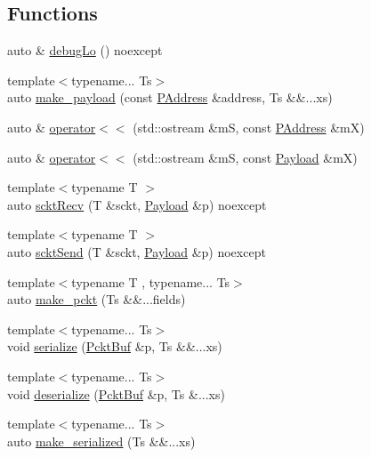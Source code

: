 \subsection*{Functions}
\begin{DoxyCompactItemize}
\item 
auto \& \hyperlink{namespacenl_a37c9c3a7bf35b2f56ab60abd0d6bd881}{debug\+Lo} () noexcept
\item 
{\footnotesize template$<$typename... Ts$>$ }\\auto \hyperlink{namespacenl_a4095539ce3ed59fbc0475a2630547294}{make\+\_\+payload} (const \hyperlink{structnl_1_1PAddress}{P\+Address} \&address, Ts \&\&...xs)
\item 
auto \& \hyperlink{namespacenl_a08c7e64bbcf163119a45fe1dc13b7b16}{operator$<$$<$} (std\+::ostream \&m\+S, const \hyperlink{structnl_1_1PAddress}{P\+Address} \&m\+X)
\item 
auto \& \hyperlink{namespacenl_aa6e936e1626c0ed89a68488298836a33}{operator$<$$<$} (std\+::ostream \&m\+S, const \hyperlink{structnl_1_1Payload}{Payload} \&m\+X)
\item 
{\footnotesize template$<$typename T $>$ }\\auto \hyperlink{namespacenl_a60cd68edf0d89cedfd2486d4ab034514}{sckt\+Recv} (T \&sckt, \hyperlink{structnl_1_1Payload}{Payload} \&p) noexcept
\item 
{\footnotesize template$<$typename T $>$ }\\auto \hyperlink{namespacenl_afa96089eb206f528f755cf13cba1fb05}{sckt\+Send} (T \&sckt, \hyperlink{structnl_1_1Payload}{Payload} \&p) noexcept
\item 
{\footnotesize template$<$typename T , typename... Ts$>$ }\\auto \hyperlink{namespacenl_a72200b84c380aa849c4b1c436d06b9af}{make\+\_\+pckt} (Ts \&\&...fields)
\item 
{\footnotesize template$<$typename... Ts$>$ }\\void \hyperlink{namespacenl_adac56cebe608906f650a64c4316a2731}{serialize} (\hyperlink{namespacenl_a789b828a23e37a113433c2838e7c8e28}{Pckt\+Buf} \&p, Ts \&\&...xs)
\item 
{\footnotesize template$<$typename... Ts$>$ }\\void \hyperlink{namespacenl_a1d08698ff343183973b60f364e70295d}{deserialize} (\hyperlink{namespacenl_a789b828a23e37a113433c2838e7c8e28}{Pckt\+Buf} \&p, Ts \&...xs)
\item 
{\footnotesize template$<$typename... Ts$>$ }\\auto \hyperlink{namespacenl_a5c410937104d5ed9438586efc5850d67}{make\+\_\+serialized} (Ts \&\&...xs)

\end{DoxyCompactItemize}
